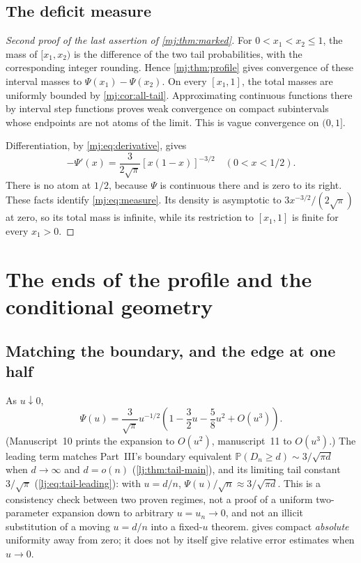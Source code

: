 \documentclass[11pt,a4paper]{article}
\theoremstyle{definition}\newaliascnt{definition}{theorem}
\theoremstyle{remark}\newaliascnt{remark}{theorem}
\newcommand{\ljP}{\mathbb P}
\begin{document}
\subsection{The deficit measure}
\label{mj:sec:words-measure}
\begin{proof}[Second proof of the last assertion of \cref{mj:thm:marked}]
For $0<x_1<x_2\le1$, the mass of $[x_1,x_2)$ is the difference of the two
tail probabilities, with the corresponding integer rounding. Hence
\cref{mj:thm:profile} gives convergence of these interval masses to
$\Psi(x_1)-\Psi(x_2)$. On every $[x_1,1]$, the total masses are uniformly bounded
by \cref{mj:cor:all-tail}. Approximating continuous functions there by
interval step functions proves weak convergence on compact subintervals
whose endpoints are not atoms of the limit. This is vague convergence on
$(0,1]$.

Differentiation, by \eqref{mj:eq:derivative}, gives
\[
 -\Psi'(x)=\frac{3}{2\sqrt\pi}[x(1-x)]^{-3/2}
 \quad(0<x<1/2).
\]
There is no atom at $1/2$, because $\Psi$ is continuous there and is zero to
its right. These facts identify \eqref{mj:eq:measure}. Its density is
asymptotic to $3x^{-3/2}/(2\sqrt\pi)$ at zero, so its total mass is
infinite, while its restriction to $[x_1,1]$ is finite for every $x_1>0$.
\end{proof}

\section{The ends of the profile and the conditional geometry}
\label{mj:sec:conditional}

\subsection{Matching the boundary, and the edge at one half}
\label{mj:sec:edges}
As $u\downarrow0$,
\begin{equation}
 \Psi(u)=\frac3{\sqrt\pi}u^{-1/2}
       \left(1-\frac32u-\frac58u^2+O(u^3)\right).
 \label{mj:eq:boundary-matching}
\end{equation}
(Manuscript~10 prints the expansion to $O(u^2)$, manuscript~11 to
$O(u^3)$.) The leading term matches Part~III's boundary equivalent
$\ljP(D_n\ge d)\sim3/\sqrt{\pi d}$ when $d\to\infty$ and $d=o(n)$
(\cref{lj:thm:tail-main}), and its limiting tail constant $3/\sqrt\pi$
(\eqref{lj:eq:tail-leading}): with $u=d/n$,
$\Psi(u)/\sqrt n\approx3/\sqrt{\pi d}$. This is a consistency check between
two proven regimes, not a proof of a uniform two-parameter expansion down to
arbitrary $u=u_n\to0$, and not an illicit substitution of a moving $u=d/n$
into a fixed-$u$ theorem.  gives compact
\emph{absolute} uniformity away from zero; it does not by itself give
relative error estimates when $u\to0$.
\end{document}
